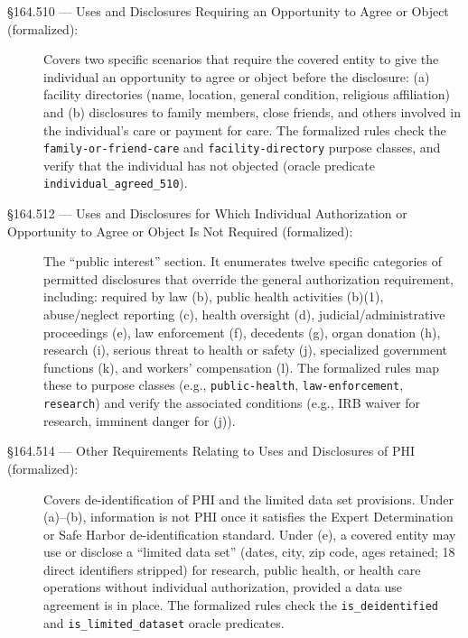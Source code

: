 \documentclass[11pt,letterpaper]{article}
\begin{document}
\begin{description}
  \item[\S 164.510 --- Uses and Disclosures Requiring an Opportunity to Agree or Object (formalized):]
    Covers two specific scenarios that require the covered entity to give the individual an
    opportunity to agree or object before the disclosure: (a) facility directories (name, location,
    general condition, religious affiliation) and (b) disclosures to family members, close friends,
    and others involved in the individual's care or payment for care. The formalized rules
    check the \texttt{family-or-friend-care} and \texttt{facility-directory} purpose classes,
    and verify that the individual has not objected (oracle predicate \texttt{individual\_agreed\_510}).

  \item[\S 164.512 --- Uses and Disclosures for Which Individual Authorization or Opportunity to
    Agree or Object Is Not Required (formalized):]
    The ``public interest'' section. It enumerates twelve specific categories of permitted
    disclosures that override the general authorization requirement, including: required by law
    (b), public health activities (b)(1), abuse/neglect reporting (c), health oversight (d),
    judicial/administrative proceedings (e), law enforcement (f), decedents (g), organ donation (h),
    research (i), serious threat to health or safety (j), specialized government functions (k),
    and workers' compensation (l). The formalized rules map these to purpose classes
    (e.g., \texttt{public-health}, \texttt{law-enforcement}, \texttt{research}) and verify the
    associated conditions (e.g., IRB waiver for research, imminent danger for (j)).

  \item[\S 164.514 --- Other Requirements Relating to Uses and Disclosures of PHI (formalized):]
    Covers de-identification of PHI and the limited data set provisions. Under (a)--(b), information
    is not PHI once it satisfies the Expert Determination or Safe Harbor de-identification standard.
    Under (e), a covered entity may use or disclose a ``limited data set'' (dates, city, zip code,
    ages retained; 18 direct identifiers stripped) for research, public health, or health care
    operations without individual authorization, provided a data use agreement is in place.
    The formalized rules check the \texttt{is\_deidentified} and \texttt{is\_limited\_dataset}
    oracle predicates.


\end{description}
\end{document}
